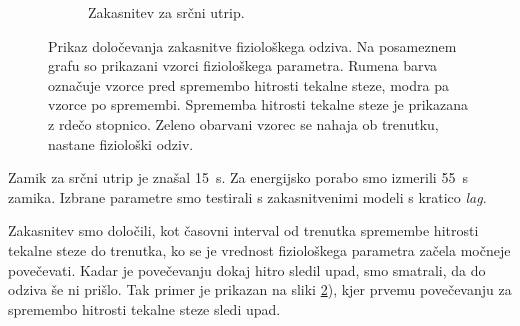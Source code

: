 \begin{figure}[!htb]
\begin{subfigure}[t]{0.45\columnwidth}
		\caption{Zakasnitev za srčni utrip.}
		\label{fig:lag-estimation-train-hr}
	\end{subfigure}
	\caption[Prikaz določevanja zakasnitve fiziološkega odziva]{Prikaz določevanja zakasnitve fiziološkega odziva. Na posameznem grafu so prikazani vzorci fiziološkega parametra. Rumena barva označuje vzorce pred spremembo hitrosti tekalne steze, modra pa vzorce po spremembi. Sprememba hitrosti tekalne steze je prikazana z rdečo stopnico. Zeleno obarvani vzorec se nahaja ob trenutku, nastane fiziološki odziv.}
	\label{fig:lag-estimation-stage1}
\end{figure}

Zamik za srčni utrip je znašal \SI{15}{\s}. Za energijsko porabo smo izmerili \SI{55}{\s} zamika. Izbrane parametre smo testirali s zakasnitvenimi modeli s kratico \textit{lag}.

Zakasnitev smo določili, kot časovni interval od trenutka spremembe hitrosti tekalne steze do trenutka, ko se je vrednost fiziološkega parametra začela močneje povečevati. Kadar je povečevanju dokaj hitro sledil upad, smo smatrali, da do odziva še ni prišlo. Tak primer je prikazan na sliki \ref{fig:lag-estimation-stage1}), kjer prvemu povečevanju za spremembo hitrosti tekalne steze sledi upad. 


